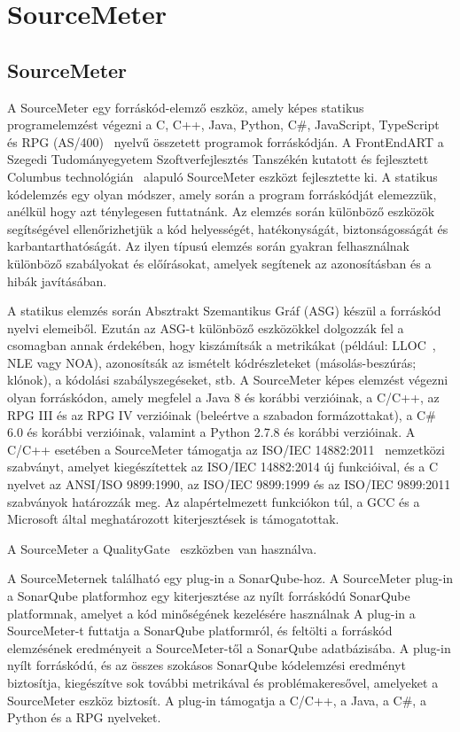 \chapter{SourceMeter}\label{chap:SourceMeter}

\section{SourceMeter}
A SourceMeter egy forráskód-elemző eszköz, amely képes statikus programelemzést végezni a C, C++, Java, Python, C\#, JavaScript, TypeScript és RPG (AS/400)~\cite{szHoke2014case}
nyelvű összetett programok forráskódján.
A FrontEndART a Szegedi Tudományegyetem Szoftverfejlesztés Tanszékén kutatott és fejlesztett Columbus technológián~\cite{beszedes2005columbus} alapuló SourceMeter eszközt fejlesztette ki.
A statikus kódelemzés egy olyan módszer, amely során a program forráskódját elemezzük, anélkül hogy azt ténylegesen futtatnánk.
Az elemzés során különböző eszközök segítségével ellenőrizhetjük a kód helyességét, hatékonyságát, biztonságosságát és karbantarthatóságát.
Az ilyen típusú elemzés során gyakran felhasználnak különböző szabályokat és előírásokat, amelyek segítenek az azonosításban és a hibák javításában.


A statikus elemzés során Absztrakt Szemantikus Gráf (ASG) készül a forráskód nyelvi elemeiből.
Ezután az ASG-t különböző eszközökkel dolgozzák fel a csomagban annak érdekében, hogy kiszámítsák a metrikákat (például: LLOC~\cite{siket2014differences, bakota2011probabilistic}, NLE vagy NOA),
azonosítsák az ismételt kódrészleteket (másolás-beszúrás; klónok), a kódolási szabályszegéseket, stb.
A SourceMeter képes elemzést végezni olyan forráskódon, amely megfelel a Java 8 és korábbi verzióinak, a C/C++,
az RPG III és az RPG IV verzióinak (beleértve a szabadon formázottakat), a C\# 6.0 és korábbi verzióinak, valamint a Python 2.7.8 és korábbi verzióinak.
A C/C++ esetében a SourceMeter támogatja az ISO/IEC 14882:2011~\cite{sourcemeter2015} nemzetközi szabványt, amelyet kiegészítettek az ISO/IEC 14882:2014 új funkcióival, és a C nyelvet az ANSI/ISO 9899:1990, az ISO/IEC 9899:1999 és az ISO/IEC 9899:2011 szabványok határozzák meg.
Az alapértelmezett funkciókon túl, a GCC és a Microsoft által meghatározott kiterjesztések is támogatottak.


A SourceMeter a QualityGate~\cite{bakota2014qualitygate} eszközben van használva.


A SourceMeternek található egy plug-in a SonarQube-hoz.
A SourceMeter plug-in a SonarQube platformhoz egy kiterjesztése az nyílt forráskódú SonarQube platformnak, amelyet a kód minőségének kezelésére használnak
A plug-in a SourceMeter-t futtatja a SonarQube platformról, és feltölti a forráskód elemzésének eredményeit a SourceMeter-től a SonarQube adatbázisába.
A plug-in nyílt forráskódú, és az összes szokásos SonarQube kódelemzési eredményt biztosítja, kiegészítve sok további metrikával és problémakeresővel, amelyeket a SourceMeter eszköz biztosít.
A plug-in támogatja a C/C++, a Java, a C\#, a Python és a RPG nyelveket.~\cite{ferenc2014source}

